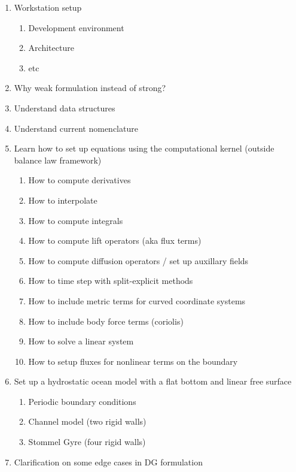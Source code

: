 \documentclass{article}
\begin{document}
\begin{enumerate}
    \item Workstation setup
        \begin{enumerate}
            \item Development environment
            \item Architecture
            \item etc
        \end{enumerate}
    \item Why weak formulation instead of strong?
    \item Understand data structures 
    \item Understand current nomenclature
    \item Learn how to set up equations using the computational kernel (outside balance law framework)
    \begin{enumerate}
        \item How to compute derivatives
        \item How to interpolate
        \item How to compute integrals
        \item How to compute lift operators (aka flux terms)
        \item How to compute diffusion operators / set up auxillary fields
        \item How to time step with split-explicit methods
        \item How to include metric terms for curved coordinate systems
        \item How to include body force terms (coriolis)
        \item How to solve a linear system
        \item How to setup fluxes for nonlinear terms on the boundary
    \end{enumerate}
    \item Set up a hydrostatic ocean model with a flat bottom and linear free surface
    \begin{enumerate}
        \item Periodic boundary conditions
        \item Channel model (two rigid walls)
        \item Stommel Gyre (four rigid walls)
    \end{enumerate}
    \item Clarification on some edge cases in DG formulation
    \begin{enumerate}

\end{enumerate}
\end{enumerate}
\end{document}
